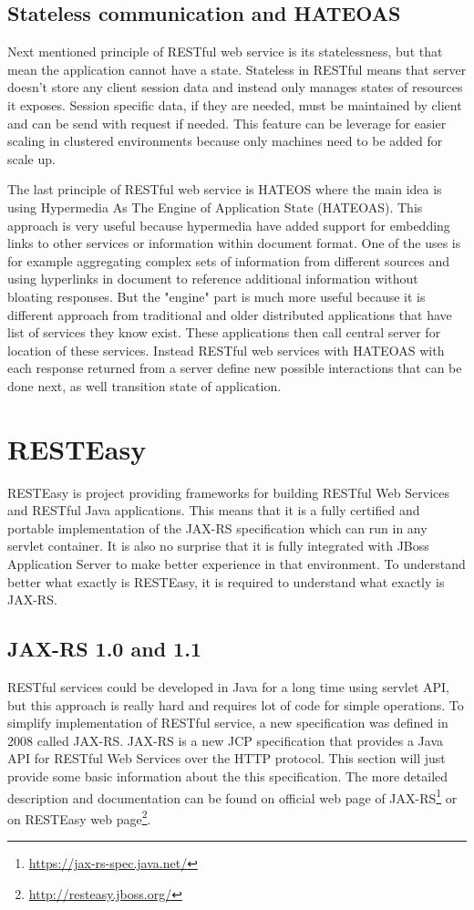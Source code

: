 \documentclass[12pt,final,oneside]{fithesis2}
\begin{document}
\subsection*{Stateless communication and HATEOAS}
Next mentioned principle of RESTful web service is its statelessness, but that mean the application cannot have a state. Stateless in RESTful means that server doesn't store any client session data and instead only manages states of resources it exposes. Session specific data, if they are needed, must be maintained by client and can be send with request if needed. This feature can be leverage for easier scaling in clustered environments because only machines need to be added for scale up. 

The last principle of RESTful web service is HATEOS where the main idea is using Hypermedia As The Engine of Application State (HATEOAS). This approach is very useful because hypermedia have added support for embedding links to other services or information within document format. One of the uses is for example aggregating complex sets of information from different sources and using hyperlinks in document to reference additional information without bloating responses. But the "engine" part is much more useful because it is different approach from traditional and older distributed applications that have list of services they know exist. These applications then call central server for location of these services. Instead RESTful web services with HATEOAS with each response returned from a server define new possible interactions that can be done next, as well transition state of application.

\section{RESTEasy}
RESTEasy is project providing frameworks for building RESTful Web Services and RESTful Java applications. This means that it is a fully certified and portable implementation of the JAX-RS specification which can run in any servlet container. It is also no surprise that it is fully integrated with JBoss Application Server to make better experience in that environment. To understand better what exactly is RESTEasy, it is required to understand what exactly is JAX-RS.\cite{resteasy-doc}

 
\subsection{JAX-RS 1.0 and 1.1}
RESTful services could be developed in Java for a long time using servlet API, but this approach is really hard and requires lot of code for simple operations. To simplify implementation of RESTful service, a new specification was defined in 2008 called JAX-RS. JAX-RS is a new JCP specification that provides a Java API for RESTful Web Services over the HTTP protocol. This section will just provide some basic information about the this specification. The more detailed description and documentation can be found on official web page of JAX-RS\footnote{\url{https://jax-rs-spec.java.net/}} or on RESTEasy web page\footnote{\url{http://resteasy.jboss.org/}}. 
\end{document}

